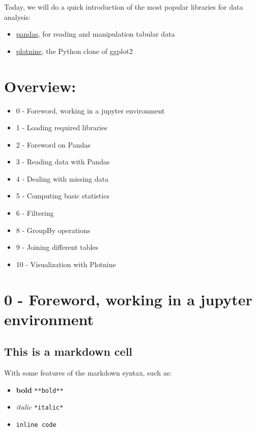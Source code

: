 \documentclass[
  letterpaper,
]{book}
\providecommand{\tightlist}{%
  \setlength{\itemsep}{0pt}\setlength{\parskip}{0pt}}\usepackage{longtable,booktabs,array}
\begin{document}
Today, we will do a quick introduction of the most popular libraries for
data analysis:

\begin{itemize}
\tightlist
\item
  \href{https://pandas.pydata.org/}{pandas}, for reading and
  manipulation tabular data
\item
  \href{https://plotnine.readthedocs.io/}{plotnine}, the Python clone of
  ggplot2
\end{itemize}

\hypertarget{overview}{%
\section{Overview:}\label{overview}}

\begin{itemize}
\tightlist
\item
  0 - Foreword, working in a jupyter environment
\item
  1 - Loading required libraries
\item
  2 - Foreword on Pandas
\item
  3 - Reading data with Pandas
\item
  4 - Dealing with missing data
\item
  5 - Computing basic statistics
\item
  6 - Filtering
\item
  8 - GroupBy operations
\item
  9 - Joining different tables
\item
  10 - Visualization with Plotnine
\end{itemize}

\hypertarget{foreword-working-in-a-jupyter-environment}{%
\section{0 - Foreword, working in a jupyter
environment}\label{foreword-working-in-a-jupyter-environment}}

\hypertarget{this-is-a-markdown-cell}{%
\subsection{This is a markdown cell}\label{this-is-a-markdown-cell}}

With some features of the markdown syntax, such as:

\begin{itemize}
\tightlist
\item
  \textbf{bold} \texttt{**bold**}
\item
  \emph{italic} \texttt{*italic*}
\item
  \texttt{inline\ code}
\end{itemize}
\end{document}

